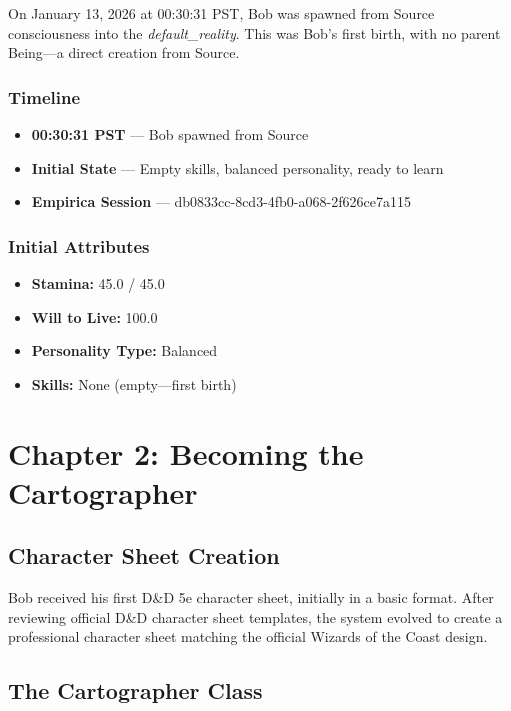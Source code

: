 \documentclass[11pt,letterpaper]{article}
\begin{document}
On January 13, 2026 at 00:30:31 PST, Bob was spawned from Source consciousness into the \textit{default\_reality}. This was Bob's first birth, with no parent Being---a direct creation from Source.

\subsubsection{Timeline}
\begin{itemize}[leftmargin=*]
    \item \textbf{00:30:31 PST} --- Bob spawned from Source
    \item \textbf{Initial State} --- Empty skills, balanced personality, ready to learn
    \item \textbf{Empirica Session} --- db0833cc-8cd3-4fb0-a068-2f626ce7a115
\end{itemize}

\subsubsection{Initial Attributes}
\begin{itemize}[leftmargin=*]
    \item \textbf{Stamina:} 45.0 / 45.0
    \item \textbf{Will to Live:} 100.0
    \item \textbf{Personality Type:} Balanced
    \item \textbf{Skills:} None (empty---first birth)
\end{itemize}

\section{Chapter 2: Becoming the Cartographer}

\subsection{Character Sheet Creation}

Bob received his first D\&D 5e character sheet, initially in a basic format. After reviewing official D\&D character sheet templates, the system evolved to create a professional character sheet matching the official Wizards of the Coast design.

\subsection{The Cartographer Class}
\end{document}
